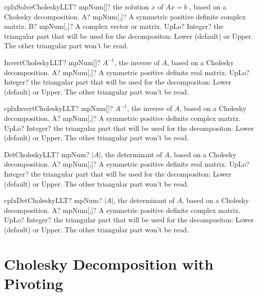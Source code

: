 \documentclass[12pt,a4paper,openany]{book}
\begin{document}
\begin{mpFunctionsExtract}
\mpFunctionThree
{cplxSolveCholeskyLLT? mpNum[]? the solution $x$ of $A x = b$ , based on a Cholesky decomposition.}
{A? mpNum[,]? A symmetric positive definite complex matrix.}
{B? mpNum[,]? A complex vector or matrix.}
{UpLo? Integer? the triangular part that will be used for the decompositon: Lower (default) or Upper. The other triangular part won't be read.}
\end{mpFunctionsExtract}

\begin{mpFunctionsExtract}
\mpFunctionTwo
{InvertCholeskyLLT? mpNum[]? $A^{-1}$, the inverse of $A$, based on a Cholesky decomposition.}
{A? mpNum[,]? A symmetric positive definite real matrix.}
{UpLo? Integer? the triangular part that will be used for the decompositon: Lower (default) or Upper. The other triangular part won't be read.}
\end{mpFunctionsExtract}

\begin{mpFunctionsExtract}
\mpFunctionTwo
{cplxInvertCholeskyLLT? mpNum[]? $A^{-1}$, the inverse of $A$, based on a Cholesky decomposition.}
{A? mpNum[,]? A symmetric positive definite complex matrix.}
{UpLo? Integer? the triangular part that will be used for the decompositon: Lower (default) or Upper. The other triangular part won't be read.}
\end{mpFunctionsExtract}

\begin{mpFunctionsExtract}
\mpFunctionTwo
{DetCholeskyLLT? mpNum? $|A|$, the determinant of $A$, based on a Cholesky decomposition.}
{A? mpNum[,]? A symmetric positive definite real matrix.}
{UpLo? Integer? the triangular part that will be used for the decompositon: Lower (default) or Upper. The other triangular part won't be read.}
\end{mpFunctionsExtract}

\begin{mpFunctionsExtract}
\mpFunctionTwo
{cplxDetCholeskyLLT? mpNum? $|A|$, the determinant of $A$, based on a Cholesky decomposition.}
{A? mpNum[,]? A symmetric positive definite complex matrix.}
{UpLo? Integer? the triangular part that will be used for the decompositon: Lower (default) or Upper. The other triangular part won't be read.}
\end{mpFunctionsExtract}

\section{Cholesky Decomposition with Pivoting}
\end{document}
